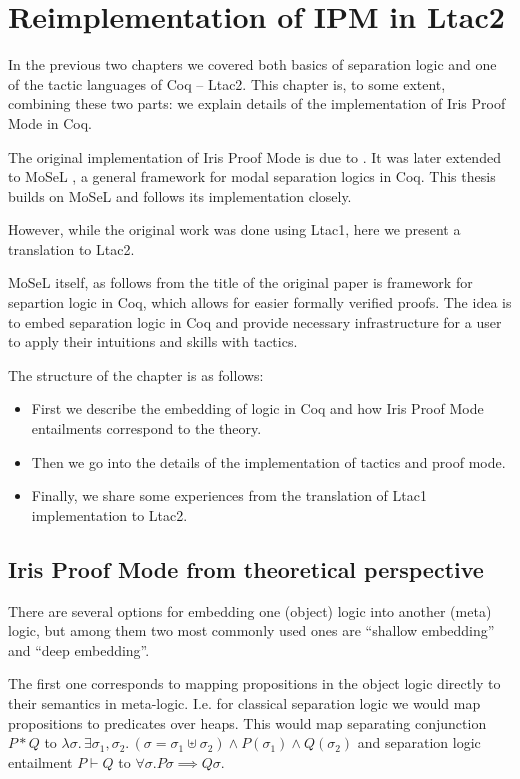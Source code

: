 \chapter{Reimplementation of IPM in Ltac2}
\label{chap:reimplementation_ipm}

In the previous two chapters we covered both basics of separation logic and one of the tactic languages of Coq -- Ltac2.
This chapter is, to some extent, combining these two parts: we explain details of the implementation of Iris Proof Mode in Coq.

The original implementation of Iris Proof Mode is due to
\citet{krebbersInteractiveProofsHigherorder2017}.
It was later extended to MoSeL \citet{krebbersMoSeLGeneralExtensible2018}, a general framework for modal separation logics in Coq.
This thesis builds on MoSeL and follows its implementation closely.

However, while the original work was done using Ltac1, here we present a translation to Ltac2.

MoSeL itself, as follows from the title of the original paper is framework for separtion logic in Coq, which allows for easier formally verified proofs.
The idea is to embed separation logic in Coq and provide necessary infrastructure for a user to apply their intuitions and skills with tactics.

The structure of the chapter is as follows:
\begin{itemize}
\item First we describe the embedding of logic in Coq and how Iris Proof Mode entailments correspond to the theory.
\item Then we go into the details of the implementation of tactics and proof mode.
\item Finally, we share some experiences from the translation of Ltac1 implementation to Ltac2.
\end{itemize}

\section{Iris Proof Mode from theoretical perspective}
\label{sec:ipm_theory}
There are several options for embedding one (object) logic into another (meta) logic, but among them two most commonly used ones are ``shallow embedding'' and ``deep embedding''.

The first one corresponds to mapping propositions in the object logic directly to their semantics in meta-logic.
I.e. for classical separation logic we would map propositions to predicates over heaps.
This would map separating conjunction \(P * Q\) to \(\lambda \sigma.\,\exists\sigma_1, \sigma_2.\, \left(\sigma = \sigma_1 \uplus \sigma_2\right) \wedge P (\sigma_1) \wedge Q(\sigma_2)\) and separation logic entailment \(P \vdash Q\) to \(\forall \sigma. P \sigma \implies Q \sigma\).

